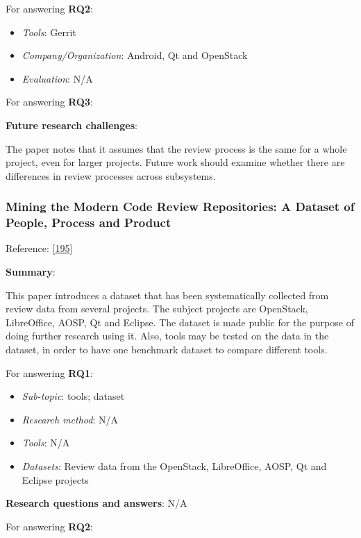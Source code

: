 \documentclass[]{book}
\providecommand{\tightlist}{%
  \setlength{\itemsep}{0pt}\setlength{\parskip}{0pt}}
\begin{document}
For answering \textbf{RQ2}:

\begin{itemize}
\tightlist
\item
  \emph{Tools}: Gerrit
\item
  \emph{Company/Organization}: Android, Qt and OpenStack
\item
  \emph{Evaluation}: N/A
\end{itemize}

For answering \textbf{RQ3}:

\textbf{Future research challenges}:

The paper notes that it assumes that the review process is the same for
a whole project, even for larger projects. Future work should examine
whether there are differences in review processes across subsystems.

\subsubsection{Mining the Modern Code Review Repositories: A Dataset of
People, Process and
Product}\label{mining-the-modern-code-review-repositories-a-dataset-of-people-process-and-product}

Reference: {[}\protect\hyperlink{ref-yang2016mining}{195}{]}

\textbf{Summary}:

This paper introduces a dataset that has been systematically collected
from review data from several projects. The subject projects are
OpenStack, LibreOffice, AOSP, Qt and Eclipse. The dataset is made public
for the purpose of doing further research using it. Also, tools may be
tested on the data in the dataset, in order to have one benchmark
dataset to compare different tools.

For answering \textbf{RQ1}:

\begin{itemize}
\tightlist
\item
  \emph{Sub-topic}: tools; dataset
\item
  \emph{Research method}: N/A
\item
  \emph{Tools}: N/A
\item
  \emph{Datasets}: Review data from the OpenStack, LibreOffice, AOSP, Qt
  and Eclipse projects
\end{itemize}

\textbf{Research questions and answers}: N/A

For answering \textbf{RQ2}:
\end{document}
